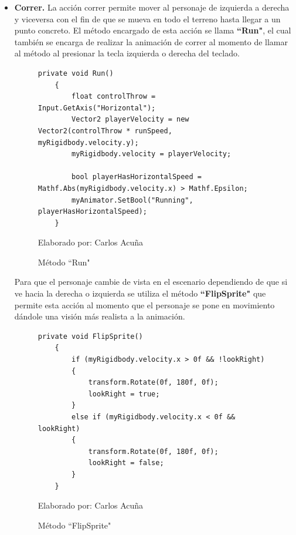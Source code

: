 \documentclass[a4paper, openright, 12pt]{report}
\begin{document}
\begin{itemize}
\item \textbf{Correr.} La acción correr permite mover al personaje de izquierda a derecha y viceversa con el fin de que se mueva en todo el terreno hasta llegar a un punto concreto. El método encargado de esta acción se llama \textbf{``Run"}, el cual también se encarga de realizar la animación de correr al momento de llamar al método al presionar la tecla izquierda o derecha del teclado.

\begin{figure}[h]
\captionsetup{justification=centering,margin=2cm}
\centering
\lstset{language=C, breaklines=true, basicstyle=\footnotesize}
\lstset{numbers=left, numberstyle=\tiny, stepnumber=1, numbersep=-2pt}
\begin{lstlisting}[frame=single]
  private void Run()
    {
        float controlThrow = Input.GetAxis("Horizontal");
        Vector2 playerVelocity = new Vector2(controlThrow * runSpeed, myRigidbody.velocity.y);
        myRigidbody.velocity = playerVelocity;

        bool playerHasHorizontalSpeed = Mathf.Abs(myRigidbody.velocity.x) > Mathf.Epsilon;
        myAnimator.SetBool("Running", playerHasHorizontalSpeed);
    }
\end{lstlisting}
\caption{Método ``Run"}
Elaborado por: Carlos Acuña
\end{figure}

Para que el personaje cambie de vista en el escenario dependiendo de que si ve hacia la derecha o izquierda se utiliza el método \textbf{``FlipSprite"} que permite esta acción al momento que el personaje se pone en movimiento dándole una visión más realista a la animación.

\begin{figure}[h]
\captionsetup{justification=centering,margin=2cm}
\centering
\lstset{language=C, breaklines=true, basicstyle=\footnotesize}
\lstset{numbers=left, numberstyle=\tiny, stepnumber=1, numbersep=-2pt}
\begin{lstlisting}[frame=single]
  private void FlipSprite()
    {
        if (myRigidbody.velocity.x > 0f && !lookRight)
        {
            transform.Rotate(0f, 180f, 0f);
            lookRight = true;
        }
        else if (myRigidbody.velocity.x < 0f && lookRight)
        {
            transform.Rotate(0f, 180f, 0f);
            lookRight = false;
        }
    }
\end{lstlisting}
\caption{Método ``FlipSprite"}
Elaborado por: Carlos Acuña
\end{figure}


\end{itemize}
\end{document}
